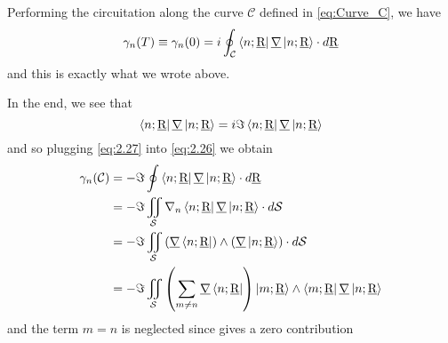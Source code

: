 Performing the circuitation along the curve $ \mathcal{C} $ defined in \eqref{eq:Curve_C}, we have
\begin{equation}
\gamma_n(T)\equiv \gamma_n(0)=i\oint_{\mathcal{C}}\Bra{n;\underline{\textrm{R}}}\underline{\nabla}\Ket{n;\underline{\textrm{R}}}\cdot\mathop{}\!d\underline{\textrm{R}}
\label{eq:2.26}\end{equation} 
and this is exactly what we wrote above.

In the end, we see that 
\begin{equation}
\Bra{n;\underline{\textrm{R}}}\underline{\nabla}\Ket{n;\underline{\textrm{R}}}=i\Im\Bra{n;\underline{\textrm{R}}}\underline{\nabla}\Ket{n;\underline{\textrm{R}}}
\label{eq:2.27}
\end{equation}
and so plugging \eqref{eq:2.27} into \eqref{eq:2.26} we obtain
\begin{align}
\gamma_n(\mathcal{C})&=-\Im \oint \Bra{n;\underline{\textrm{R}}}\underline{\nabla}\Ket{n;\underline{\textrm{R}}}\cdot\mathop{}\!d\underline{\textrm{R}}\\
&=-\Im\iint_{\mathcal{S}}\nabla_n\Bra{n;\underline{\textrm{R}}}\underline{\nabla}\Ket{n;\underline{\textrm{R}}}\cdot\mathop{}\!d\mathcal{S}\\
&=-\Im\iint_{\mathcal{S}}\left(\underline{\nabla}\Bra{n;\underline{\textrm{R}}}\right)\wedge\left(\underline{\nabla}\Ket{n;\underline{\textrm{R}}}\right)\cdot\mathop{}\!d\mathcal{S}\\
&= -\Im \iint_{\mathcal{S}}\left(\sum_{m\neq n}\underline{\nabla}\Bra{n;\underline{\textrm{R}}}\right)\Ket{m;\underline{\textrm{R}}}\wedge\Bra{m;\underline{\textrm{R}}}\underline{\nabla}\Ket{n;\underline{\textrm{R}}}
\end{align}
and the term $ m=n $ is neglected since gives a zero contribution
